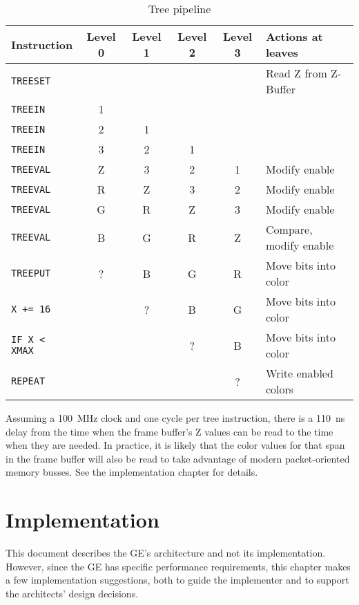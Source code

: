 \documentclass{book}
\begin{document}
\begin{table}[ht]
\begin{tabular}{lccccl}
Instruction & Level 0 & Level 1 & Level 2 & Level 3 & Actions at leaves\\
\hline
{\tt TREESET}     &         &         &         &         & Read Z from Z-Buffer\\
{\tt TREEIN}      &    1    &         &         &         &\\
{\tt TREEIN}      &    2    &    1    &         &         &\\
{\tt TREEIN}      &    3    &    2    &    1    &         &\\
{\tt TREEVAL}     &    Z    &    3    &    2    &    1    & Modify enable\\
{\tt TREEVAL}     &    R    &    Z    &    3    &    2    & Modify enable\\
{\tt TREEVAL}     &    G    &    R    &    Z    &    3    & Modify enable\\
{\tt TREEVAL}     &    B    &    G    &    R    &    Z    & Compare, modify enable\\
{\tt TREEPUT}     &    ?    &    B    &    G    &    R    & Move bits into color\\
{\tt X += 16}     &         &    ?    &    B    &    G    & Move bits into color\\
{\tt IF X < XMAX} &         &         &    ?    &    B    & Move bits into color\\
{\tt REPEAT}      &         &         &         &    ?    & Write enabled colors\\
\end{tabular}
\caption{Tree pipeline}
\label{tab:treepipeline}
\end{table}

Assuming a 100~MHz clock and one cycle per tree instruction, there is
a 110~ns delay from the time when the frame buffer's Z values can be
read to the time when they are needed.  In practice, it is likely that
the color values for that span in the frame buffer will also be read
to take advantage of modern packet-oriented memory busses.  See the
implementation chapter for details.

\chapter{Implementation}

This document describes the GE's architecture and not its implementation.
However, since the GE has specific performance requirements, this chapter
makes a few implementation suggestions, both to guide the implementer and
to support the architects' design decisions.
\end{document}
